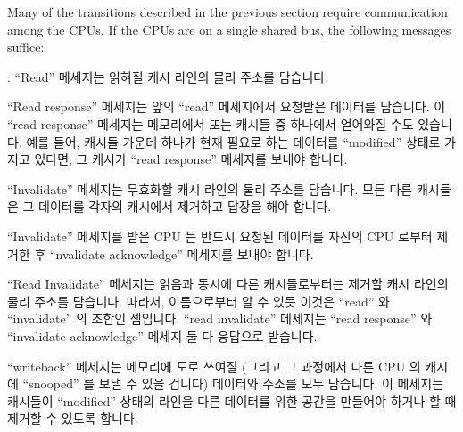 Many of the transitions described in the previous section require
communication among the CPUs.
If the CPUs are on a single shared bus, the following messages suffice:
\fi
\begin{description}[style=nextline]
\item	[Read]:
	``Read'' 메세지는 읽혀질 캐시 라인의 물리 주소를 담습니다.
\item	[Read Response:]
	``Read response'' 메세지는 앞의 ``read'' 메세지에서 요청받은 데이터를
	담습니다.
	이 ``read response'' 메세지는 메모리에서 또는 캐시들 중 하나에서
	얻어와질 수도 있습니다.
	예를 들어, 캐시들 가운데 하나가 현재 필요로 하는 데이터를 ``modified''
	상태로 가지고 있다면, 그 캐시가 ``read response'' 메세지를 보내야
	합니다.
\item	[Invalidate:]
	``Invalidate'' 메세지는 무효화할 캐시 라인의 물리 주소를 담습니다.
	모든 다른 캐시들은 그 데이터를 각자의 캐시에서 제거하고 답장을 해야
	합니다.
\item	[Invalidate Acknowledge:]
	``Invalidate'' 메세지를 받은 CPU 는 반드시 요청된 데이터를 자신의 CPU
	로부터 제거한 후 ``nvalidate acknowledge'' 메세지를 보내야 합니다.

\item	[Read Invalidate:]
	``Read Invalidate'' 메세지는 읽음과 동시에 다른 캐시들로부터는 제거할
	캐시 라인의 물리 주소를 담습니다.
	따라서, 이름으로부터 알 수 있듯 이것은 ``read'' 와 ``invalidate'' 의
	조합인 셈입니다.
	``read invalidate'' 메세지는 ``read response'' 와 ``invalidate
	acknowledge'' 메세지 둘 다 응답으로 받습니다.
\item	[Writeback:]
	``writeback'' 메세지는 메모리에 도로 쓰여질  (그리고 그 과정에서 다른
	CPU 의 캐시에 ``snooped'' 를 보낼 수 있을 겁니다) 데이터와 주소를 모두
	담습니다.
	이 메세지는 캐시들이 ``modified'' 상태의 라인을 다른 데이터를 위한
	공간을 만들어야 하거나 할 때 제거할 수 있도록 합니다.
\iffalse


\end{description}
